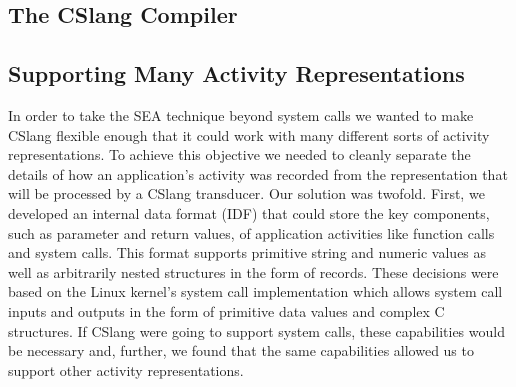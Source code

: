 \subsection{The CSlang Compiler}


\subsection{Supporting Many Activity Representations}

In order to take the SEA technique beyond system calls we wanted to make
CSlang flexible enough that it could work with many different sorts of
activity representations.
To achieve this objective we needed to cleanly separate the details of how
an application's activity was recorded from the representation that will be
processed by a CSlang transducer.
Our solution was twofold.  First, we developed an internal data format
(IDF) that
could store the key components, such as parameter and return values,
of application activities like function
calls and system calls.  This format supports primitive string and numeric
values as well as arbitrarily nested structures in the form of records.
These decisions were based on the Linux kernel's system call implementation
which allows system call inputs and outputs in the form of primitive data
values and complex C structures.
If CSlang were going to support system calls, these capabilities would be
necessary and, further, we found that the same capabilities allowed us to
support other activity representations.


